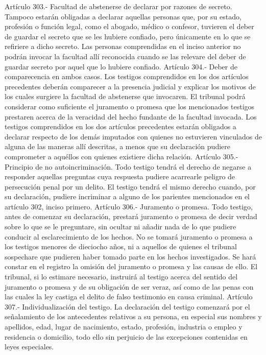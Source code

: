     Artículo 303.- Facultad de abstenerse de declarar por razones de secreto. Tampoco estarán obligadas a declarar aquellas personas que, por su estado, profesión o función legal, como el abogado, médico o confesor, tuvieren el deber de guardar el secreto que se les hubiere confiado, pero únicamente en lo que se refiriere a dicho secreto.
    Las personas comprendidas en el inciso anterior no podrán invocar la facultad allí reconocida cuando se las relevare del deber de guardar secreto por aquel que lo hubiere confiado.
    Artículo 304.- Deber de comparecencia en ambos casos. Los testigos comprendidos en los dos artículos precedentes deberán comparecer a la presencia judicial y explicar los motivos de los cuales surgiere la facultad de abstenerse que invocaren. El tribunal podrá considerar como suficiente el juramento o promesa que los mencionados testigos prestaren acerca de la veracidad del hecho fundante de la facultad invocada.
    Los testigos comprendidos en los dos artículos precedentes estarán obligados a declarar respecto de los demás imputados con quienes no estuvieren vinculados de alguna de las maneras allí descritas, a menos que su declaración pudiere comprometer a aquéllos con quienes existiere dicha relación.
    Artículo 305.- Principio de no autoincriminación. Todo testigo tendrá el derecho de negarse a responder aquellas preguntas cuya respuesta pudiere acarrearle peligro de persecución penal por un delito.
    El testigo tendrá el mismo derecho cuando, por su declaración, pudiere incriminar a alguno de los parientes mencionados en el artículo 302, inciso primero.
    Artículo 306.- Juramento o promesa. Todo testigo, antes de comenzar su declaración, prestará juramento o promesa de decir verdad sobre lo que se le preguntare, sin ocultar ni añadir nada de lo que pudiere conducir al esclarecimiento de los hechos.
    No se tomará juramento o promesa a los testigos menores de dieciocho años, ni a aquellos de quienes el tribunal sospechare que pudieren haber tomado parte en los hechos investigados. Se hará constar en el registro la omisión del juramento o promesa y las causas de ello.
    El tribunal, si lo estimare necesario, instruirá al testigo acerca del sentido del juramento o promesa y de su obligación de ser veraz, así como de las penas con las cuales la ley castiga el delito de falso testimonio en causa criminal.
    Artículo 307.- Individualización del testigo. La declaración del testigo comenzará por el señalamiento de los antecedentes relativos a su persona, en especial sus nombres y apellidos, edad, lugar de nacimiento, estado, profesión, industria o empleo y residencia o domicilio, todo ello sin perjuicio de las excepciones contenidas en leyes especiales.
